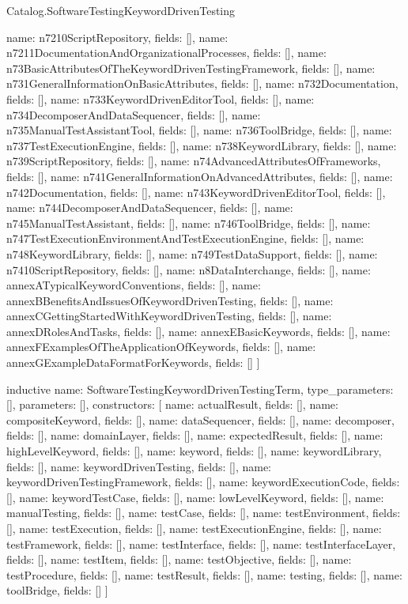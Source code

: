 \begin{lexlean}{Catalog.SoftwareTestingKeywordDrivenTesting}
\begin{semanticmodule}
{    {name: n7210ScriptRepository, fields: []},
    {name: n7211DocumentationAndOrganizationalProcesses, fields: []},
    {name: n73BasicAttributesOfTheKeywordDrivenTestingFramework, fields: []},
    {name: n731GeneralInformationOnBasicAttributes, fields: []},
    {name: n732Documentation, fields: []},
    {name: n733KeywordDrivenEditorTool, fields: []},
    {name: n734DecomposerAndDataSequencer, fields: []},
    {name: n735ManualTestAssistantTool, fields: []},
    {name: n736ToolBridge, fields: []},
    {name: n737TestExecutionEngine, fields: []},
    {name: n738KeywordLibrary, fields: []},
    {name: n739ScriptRepository, fields: []},
    {name: n74AdvancedAttributesOfFrameworks, fields: []},
    {name: n741GeneralInformationOnAdvancedAttributes, fields: []},
    {name: n742Documentation, fields: []},
    {name: n743KeywordDrivenEditorTool, fields: []},
    {name: n744DecomposerAndDataSequencer, fields: []},
    {name: n745ManualTestAssistant, fields: []},
    {name: n746ToolBridge, fields: []},
    {name: n747TestExecutionEnvironmentAndTestExecutionEngine, fields: []},
    {name: n748KeywordLibrary, fields: []},
    {name: n749TestDataSupport, fields: []},
    {name: n7410ScriptRepository, fields: []},
    {name: n8DataInterchange, fields: []},
    {name: annexATypicalKeywordConventions, fields: []},
    {name: annexBBenefitsAndIssuesOfKeywordDrivenTesting, fields: []},
    {name: annexCGettingStartedWithKeywordDrivenTesting, fields: []},
    {name: annexDRolesAndTasks, fields: []},
    {name: annexEBasicKeywords, fields: []},
    {name: annexFExamplesOfTheApplicationOfKeywords, fields: []},
    {name: annexGExampleDataFormatForKeywords, fields: []}
  ]
}

inductive{
  name: SoftwareTestingKeywordDrivenTestingTerm,
  type_parameters: [],
  parameters: [],
  constructors: [
    {name: actualResult, fields: []},
    {name: compositeKeyword, fields: []},
    {name: dataSequencer, fields: []},
    {name: decomposer, fields: []},
    {name: domainLayer, fields: []},
    {name: expectedResult, fields: []},
    {name: highLevelKeyword, fields: []},
    {name: keyword, fields: []},
    {name: keywordLibrary, fields: []},
    {name: keywordDrivenTesting, fields: []},
    {name: keywordDrivenTestingFramework, fields: []},
    {name: keywordExecutionCode, fields: []},
    {name: keywordTestCase, fields: []},
    {name: lowLevelKeyword, fields: []},
    {name: manualTesting, fields: []},
    {name: testCase, fields: []},
    {name: testEnvironment, fields: []},
    {name: testExecution, fields: []},
    {name: testExecutionEngine, fields: []},
    {name: testFramework, fields: []},
    {name: testInterface, fields: []},
    {name: testInterfaceLayer, fields: []},
    {name: testItem, fields: []},
    {name: testObjective, fields: []},
    {name: testProcedure, fields: []},
    {name: testResult, fields: []},
    {name: testing, fields: []},
    {name: toolBridge, fields: []}
  ]
}


\end{semanticmodule}
\end{lexlean}
